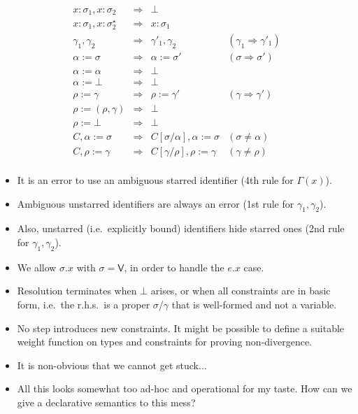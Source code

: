 \documentclass[10pt,a4paper]{article}
\newcommand\y[1]{\ensuremath{\mathsf{#1}}\xspace}
\newcommand\K[1]{\ensuremath{\textsf{#1}}}
\newcommand\note[1]{\noindent #1}
\begin{document}
$$\begin{array}{lcll}
x{:}\sigma_1,x{:}\sigma_2 &\Rightarrow& \bot \\
x{:}\sigma_1,x{:}\sigma_2^\star &\Rightarrow& x{:}\sigma_1 \\
\gamma_1,\gamma_2 &\Rightarrow& \gamma'_1,\gamma_2 & (\gamma_1 \Rightarrow \gamma'_1) \\
[1ex]
\alpha{:=}\sigma &\Rightarrow& \alpha{:=}\sigma' & (\sigma \Rightarrow \sigma') \\
\alpha{:=}\alpha &\Rightarrow& \bot \\
\alpha{:=}\bot &\Rightarrow& \bot \\
\rho{:=}\gamma &\Rightarrow& \rho{:=}\gamma' & (\gamma \Rightarrow \gamma') \\
\rho{:=}(\rho,\gamma) &\Rightarrow& \bot \\
\rho{:=}\bot &\Rightarrow& \bot \\
[1ex]
C,\alpha{:=}\sigma &\Rightarrow& C[\sigma/\alpha],\alpha{:=}\sigma & (\sigma \neq \alpha) \\
C,\rho{:=}\gamma &\Rightarrow& C[\gamma/\rho],\rho{:=}\gamma & (\gamma \neq \rho) \\
\end{array}
$$

\note{
\begin{itemize}
\item It is an error to use an ambiguous starred identifier (4th rule for $\Gamma(x)$).
\item Ambiguous unstarred identifiers are always an error (1st rule for $\gamma_1,\gamma_2$).
\item Also, unstarred (i.e.\ explicitly bound) identifiers hide starred ones (2nd rule for $\gamma_1,\gamma_2$).
\item We allow $\sigma.x$ with $\sigma=\y{V}$, in order to handle the $e\K.x$ case.
\item Resolution terminates when $\bot$ arises, or when all constraints are in basic form, i.e.\ the r.h.s.\ is a proper $\sigma$/$\gamma$ that is well-formed and not a variable.
\item No step introduces new constraints. %
It might be possible to define a suitable weight function on types and constraints for proving non-divergence.
\item It is non-obvious that we cannot get stuck...
\item All this looks somewhat too ad-hoc and operational for my taste. How can we give a declarative semantics to this mess?
\end{itemize}
}
\end{document}
